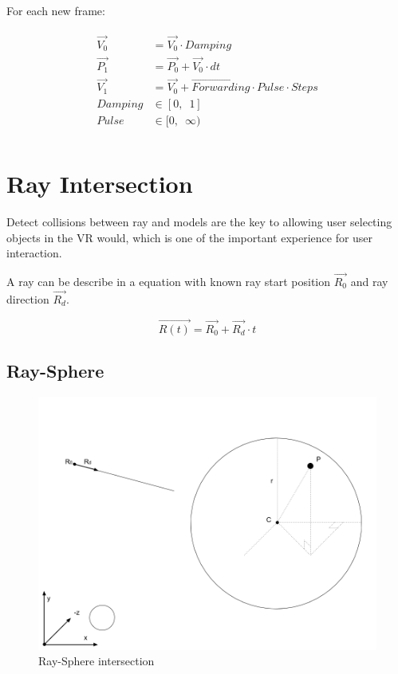 For each new frame:

\[
\begin{array}{lr}
\begin{aligned}
\overrightarrow{V_0} &= \overrightarrow{V_0} \cdot Damping\\
\overrightarrow{P_1} &= \overrightarrow{P_0} + \overrightarrow{V_0} \cdot dt\\
\overrightarrow{V_1} &= \overrightarrow{V_0} + \overrightarrow{Forwarding} \cdot Pulse \cdot Steps\\
Damping &\in [0,\enspace1]\\
Pulse &\in [0,\enspace \infty)\\
\end{aligned}
\end{array}
\]

\section{Ray Intersection}

Detect collisions between ray and models are the key to allowing user selecting objects in the VR would, which is one of the important experience for user interaction.

A ray can be describe in a equation with known ray start position \emph{$\overrightarrow{R_0}$} and ray direction \emph{$\overrightarrow{R_d}$}.

\begin{equation}
\label{equ:ray-t}
\overrightarrow{R(t)} = \overrightarrow{R_0} + \overrightarrow{R_d} \cdot t
\end{equation}

\subsection{Ray-Sphere}

\begin{figure}[H]
\caption[ray-sphere-intersection]{Ray-Sphere intersection}
\label{fig:ray-sphere}
\centering
\includegraphics[width=\linewidth]{Figures/ray-sphere-intersection.png}
\decoRule
\end{figure}

